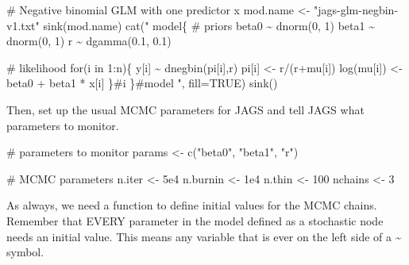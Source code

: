 \documentclass[
  13,
  letterpaper,
]{report}
\newenvironment{Shaded}{\begin{snugshade}}{\end{snugshade}}
\newcommand{\AttributeTok}[1]{\textcolor[rgb]{0.40,0.45,0.13}{#1}}
\newcommand{\CommentTok}[1]{\textcolor[rgb]{0.37,0.37,0.37}{#1}}
\newcommand{\ConstantTok}[1]{\textcolor[rgb]{0.56,0.35,0.01}{#1}}
\newcommand{\DecValTok}[1]{\textcolor[rgb]{0.68,0.00,0.00}{#1}}
\newcommand{\FloatTok}[1]{\textcolor[rgb]{0.68,0.00,0.00}{#1}}
\newcommand{\FunctionTok}[1]{\textcolor[rgb]{0.28,0.35,0.67}{#1}}
\newcommand{\NormalTok}[1]{\textcolor[rgb]{0.00,0.23,0.31}{#1}}
\newcommand{\OtherTok}[1]{\textcolor[rgb]{0.00,0.23,0.31}{#1}}
\newcommand{\StringTok}[1]{\textcolor[rgb]{0.13,0.47,0.30}{#1}}
\begin{document}
\begin{Shaded}
\begin{Highlighting}[]
\CommentTok{\# Negative binomial GLM with one predictor x}
\NormalTok{mod.name }\OtherTok{\textless{}{-}} \StringTok{"jags{-}glm{-}negbin{-}v1.txt"}
\FunctionTok{sink}\NormalTok{(mod.name)}
\FunctionTok{cat}\NormalTok{(}\StringTok{"}
\StringTok{    model\{}
\StringTok{        \# priors}
\StringTok{        beta0 \textasciitilde{} dnorm(0, 1)}
\StringTok{        beta1 \textasciitilde{} dnorm(0, 1)}
\StringTok{        r \textasciitilde{} dgamma(0.1, 0.1)}

\StringTok{        \# likelihood}
\StringTok{        for(i in 1:n)\{}
\StringTok{            y[i] \textasciitilde{} dnegbin(pi[i],r)}
\StringTok{            pi[i] \textless{}{-} r/(r+mu[i])}
\StringTok{            log(mu[i]) \textless{}{-} beta0 + beta1 * x[i]}
\StringTok{            }
\StringTok{        \}\#i}
\StringTok{    \}\#model}
\StringTok{"}\NormalTok{, }\AttributeTok{fill=}\ConstantTok{TRUE}\NormalTok{)}
\FunctionTok{sink}\NormalTok{()}
\end{Highlighting}
\end{Shaded}

Then, set up the usual MCMC parameters for JAGS and tell JAGS what
parameters to monitor.

\begin{Shaded}
\begin{Highlighting}[]
\CommentTok{\# parameters to monitor}
\NormalTok{params }\OtherTok{\textless{}{-}} \FunctionTok{c}\NormalTok{(}\StringTok{"beta0"}\NormalTok{, }\StringTok{"beta1"}\NormalTok{, }\StringTok{"r"}\NormalTok{)}

\CommentTok{\# MCMC parameters}
\NormalTok{n.iter }\OtherTok{\textless{}{-}} \FloatTok{5e4}
\NormalTok{n.burnin }\OtherTok{\textless{}{-}} \FloatTok{1e4}
\NormalTok{n.thin }\OtherTok{\textless{}{-}} \DecValTok{100}
\NormalTok{nchains }\OtherTok{\textless{}{-}} \DecValTok{3}
\end{Highlighting}
\end{Shaded}

As always, we need a function to define initial values for the MCMC
chains. Remember that EVERY parameter in the model defined as a
stochastic node needs an initial value. This means any variable that is
ever on the left side of a \textasciitilde{} symbol.
\end{document}
